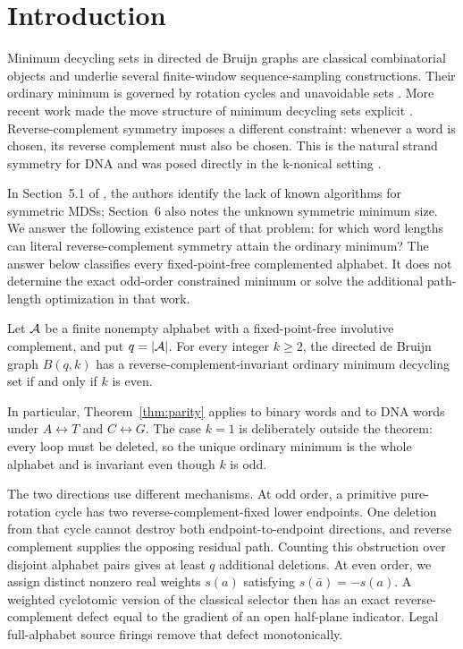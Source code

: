\section{Introduction}
\label{sec:introduction}

Minimum decycling sets in directed de Bruijn graphs are classical
combinatorial objects and underlie several finite-window sequence-sampling
constructions.  Their ordinary minimum is governed by rotation cycles and
unavoidable sets \cite{Mykkeltveit1972,ChamparnaudHanselPerrin2004}.  More
recent work made the move structure of minimum decycling sets explicit
\cite{MarcaisDeBlasioKingsford2024}.  Reverse-complement symmetry imposes a
different constraint: whenever a word is chosen, its reverse complement must
also be chosen.  This is the natural strand symmetry for DNA and was posed
directly in the k-nonical setting \cite{MarcaisElderKingsford2024}.

In Section~5.1 of \cite{MarcaisElderKingsford2024}, the authors identify
the lack of known algorithms for symmetric MDSs; Section~6 also notes the
unknown symmetric minimum size. We answer the following existence part of
that problem: for which word lengths can literal reverse-complement
symmetry attain the ordinary minimum? The answer below classifies every
fixed-point-free complemented alphabet. It does not determine the exact
odd-order constrained minimum or solve the additional path-length
optimization in that work.

\begin{theorem}
\label{thm:parity}
Let $\mathcal A$ be a finite nonempty alphabet with a fixed-point-free involutive
complement, and put $q=|\mathcal A|$.  For every integer $k\geq2$, the directed de
Bruijn graph $B(q,k)$ has a reverse-complement-invariant ordinary minimum
decycling set if and only if $k$ is even.
\end{theorem}

In particular, Theorem~\ref{thm:parity} applies to binary words and to DNA
words under $A\leftrightarrow T$ and $C\leftrightarrow G$.  The case $k=1$
is deliberately outside the theorem: every loop must be deleted, so the
unique ordinary minimum is the whole alphabet and is invariant even though
$k$ is odd.

The two directions use different mechanisms.  At odd order, a primitive
pure-rotation cycle has two reverse-complement-fixed lower endpoints.  One
deletion from that cycle cannot destroy both endpoint-to-endpoint directions,
and reverse complement supplies the opposing residual path. Counting this
obstruction over disjoint alphabet pairs gives at least $q$ additional
deletions. At even order,
we assign distinct nonzero real weights $s(a)$ satisfying
$s(\bar a)=-s(a)$.  A weighted cyclotomic version of the classical selector
then has an exact reverse-complement defect equal to the gradient of an open
half-plane indicator.  Legal full-alphabet source firings remove that defect
monotonically.

